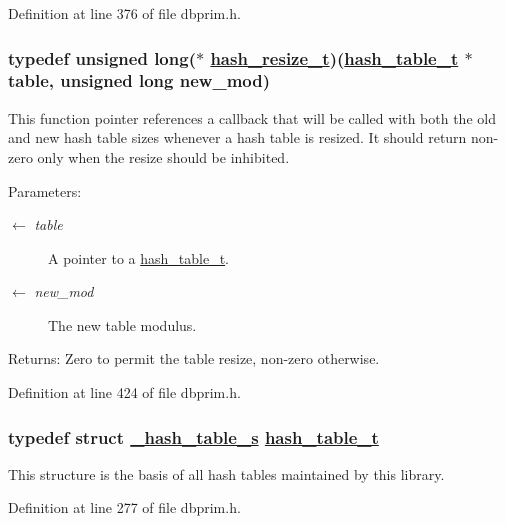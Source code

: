 Definition at line 376 of file dbprim.h.\hypertarget{group__dbprim__hash_ga6}{
\subsubsection[hash\_\-resize\_\-t]{\setlength{\rightskip}{0pt plus 5cm}typedef unsigned long($\ast$ \hyperlink{group__dbprim__hash_ga6}{hash\_\-resize\_\-t})(\hyperlink{struct__hash__table__s}{hash\_\-table\_\-t} $\ast$table, unsigned long new\_\-mod)}}
\label{group__dbprim__hash_ga6}


This function pointer references a callback that will be called with both the old and new hash table sizes whenever a hash table is resized. It should return non-zero only when the resize should be inhibited.

\begin{Desc}
\item[Parameters:]
\begin{description}
\item[\mbox{$\leftarrow$} {\em table}]A pointer to a \hyperlink{group__dbprim__hash_ga1}{hash\_\-table\_\-t}. \item[\mbox{$\leftarrow$} {\em new\_\-mod}]The new table modulus.\end{description}
\end{Desc}
\begin{Desc}
\item[Returns:]Zero to permit the table resize, non-zero otherwise.\end{Desc}


Definition at line 424 of file dbprim.h.\hypertarget{group__dbprim__hash_ga1}{
\subsubsection[hash\_\-table\_\-t]{\setlength{\rightskip}{0pt plus 5cm}typedef struct \hyperlink{struct__hash__table__s}{\_\-hash\_\-table\_\-s} \hyperlink{struct__hash__table__s}{hash\_\-table\_\-t}}}
\label{group__dbprim__hash_ga1}


This structure is the basis of all hash tables maintained by this library.

Definition at line 277 of file dbprim.h.

